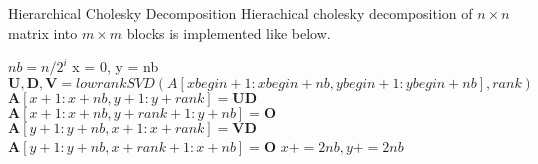 \begin{frame}{Hierarchical Cholesky Decomposition}
Hierachical cholesky decomposition of $n\times n$ matrix into $m\times m$ blocks is implemented like below.
\begin{algorithm}[H]
	\caption{Hierachical cholesky decomposition}
	\begin{algorithmic}[1]
		\scriptsize
		\State $nb = n/2^i$
		\State x = 0, y = nb
		\State $\mathbf{U,D,V} = lowrankSVD(A[xbegin+1:xbegin+nb,ybegin+1:ybegin+nb], rank)$
		\State $\mathbf{A}[x + 1:x + nb, y + 1:y + rank] = \mathbf{UD}$
		\State $\mathbf{A}[x + 1:x + nb, y + rank+1:y + nb] = \mathbf{O}$
		\State $\mathbf{A}[y + 1:y + nb, x + 1:x + rank] = \mathbf{VD}$
		\State $\mathbf{A}[y + 1:y + nb, x + rank+1:x + nb] = \mathbf{O}$
		\State $x += 2nb, y += 2nb$
		\EndFor
		\EndFor
		\EndProcedure
		
	\end{algorithmic}\label{alg:hchol}
\end{algorithm}
\end{frame}


